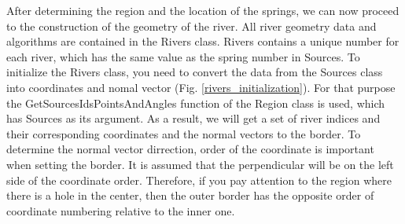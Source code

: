 \documentclass[]{pracamgr}
\begin{document}
      After determining the region and the location of the springs, we can now proceed to the construction of the geometry of the river. All river geometry data and algorithms are contained in the Rivers class. Rivers contains a unique number for each river, which has the same value as the spring number in Sources. To initialize the Rivers class, you need to convert the data from the Sources class into coordinates and nomal vector (Fig. \ref{rivers_initialization}). For that purpose the GetSourcesIdsPointsAndAngles function of the Region class is used, which has Sources as its argument. As a result, we will get a set of river indices and their corresponding coordinates and the normal vectors to the border. To determine the normal vector dirrection, order of the coordinate is important when setting the border. It is assumed that the perpendicular will be on the left side of the coordinate order. Therefore, if you pay attention to the region where there is a hole in the center, then the outer border has the opposite order of coordinate numbering relative to the inner one.
      
\end{document}
